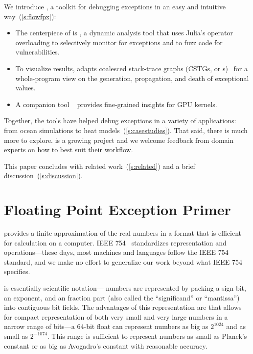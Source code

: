 \documentclass{juliacon}
\begin{document}
We introduce \FlowFPX{}, a toolkit for debugging
\fp{} exceptions in an easy and intuitive way~(\cref{s:flowfpx}):
\begin{itemize}
  \item
    The centerpiece of \FlowFPX{} is \FT{}, a dynamic analysis tool that uses
    Julia's operator overloading to selectively monitor for exceptions and to
    fuzz code for vulnerabilities.
  \item
    To visualize results, \FT{} adapts coalesced stack-trace graphs 
    (CSTGs, or \CSTG{}s)~\cite{humphreySystematicDebuggingMethods2014} for a whole-program view on the generation,
    propagation, and death of exceptional values.
  \item A companion tool \GPUFPX{}~\cite{llsflg-hpdc-2023} provides fine-grained insights for GPU kernels.
\end{itemize}
%
Together, the \FlowFPX{} tools have helped debug exceptions in a variety
of applications: from ocean simulations to heat models~(\cref{s:casestudies}).
That said, there is much more to explore.
\FlowFPX{} is a growing project and we welcome feedback from domain experts
on how to best suit their workflow.

This paper concludes with related work~(\cref{s:related}) and a
brief discussion~(\cref{s:discussion}).

\section{Floating Point Exception Primer}
\label{s:background}

\Fp{} provides a finite approximation of the real numbers in a format that is efficient for calculation on a computer.
IEEE 754~\cite{IEEEStandardBinary1985} standardizes \fp{} representation and operations---these days, most machines and languages follow the IEEE 754 standard, and we make no effort to generalize our work beyond what IEEE 754 specifies.

\Fp{} is essentially scientific notation---\fp{} numbers are represented by packing a sign bit, an exponent, and an fraction part (also called the ``significand'' or ``mantissa'') into contiguous bit fields.
The advantages of this representation are that allows for compact representation of both very small and very large numbers in a narrow range of bits---a 64-bit float can represent numbers as big as $2^{1024}$ and as small as $2^{-1074}$.
This range is sufficient to represent numbers as small as Planck's constant or as big as Avogadro's constant with reasonable accuracy.
\end{document}
